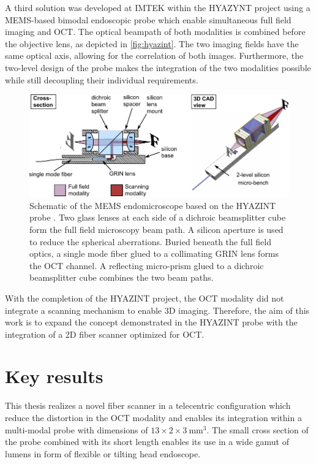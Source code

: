 A third solution was developed at IMTEK within the HYAZYNT project \cite{Blattmann} \cite{Kretschmer} using a MEMS-based bimodal endoscopic probe which enable simultaneous full field imaging and OCT. The optical beampath of both modalities is combined before the objective lens, as depicted in \autoref{fig:hyazint}. The two imaging fields have the same optical axis, allowing for the correlation of both images. Furthermore, the two-level design of the probe makes the integration of the two modalities possible while still decoupling their individual requirements. 
\begin{figure}[h!]\centering
      \includegraphics{figures/10_Introduction/hyazint.pdf}
      \caption{Schematic of the MEMS endomicroscope based on the HYAZINT probe \cite{Blattmann}. Two glass lenses at each side of a dichroic beamsplitter cube form the full field microscopy beam path. A silicon aperture is used to reduce the spherical aberrations. Buried beneath the full field optics, a single mode fiber glued to a collimating GRIN lens forms the OCT channel. A reflecting micro-prism glued to a dichroic beamsplitter cube combines the two beam paths.}
      \label{fig:hyazint}
\end{figure}
With the completion of the HYAZINT project, the OCT modality did not integrate a scanning mechanism to enable 3D imaging. Therefore, the aim of this work is to expand the concept demonstrated in the HYAZINT probe with the integration of a 2D fiber scanner optimized for OCT.


\section{Key results}
This thesis realizes a novel fiber scanner in a telecentric configuration which reduce the distortion in the OCT modality and enables its integration within a multi-modal probe with dimensions of $13 \times 2 \times \SI{3}{\milli\meter^3}$. The small cross section of the probe combined with its short length enables its use in a wide gamut of lumens in form of flexible or tilting head endoscope.

